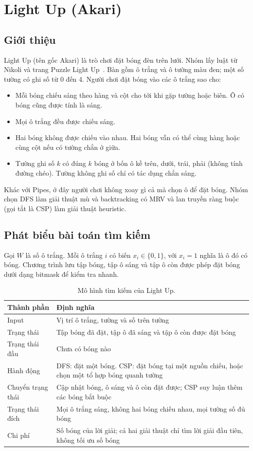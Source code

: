 \clearpage
\section{Light Up (Akari)}
\subsection{Giới thiệu}
Light Up (tên gốc Akari) là trò chơi đặt bóng đèn trên lưới. Nhóm lấy luật từ
Nikoli và trang Puzzle Light Up~\cite{akari-rules,lightup}. Bàn gồm ô trắng và
ô tường màu đen; một số tường có ghi số từ 0 đến 4. Người chơi đặt bóng vào
các ô trắng sao cho:
\begin{itemize}
\item Mỗi bóng chiếu sáng theo hàng và cột cho tới khi gặp tường hoặc biên.
Ô có bóng cũng được tính là sáng.
\item Mọi ô trắng đều được chiếu sáng.
\item Hai bóng không được chiếu vào nhau. Hai bóng vẫn có thể cùng hàng hoặc
cùng cột nếu có tường chắn ở giữa.
\item Tường ghi số $k$ có đúng $k$ bóng ở bốn ô kề trên, dưới, trái, phải
(không tính đường chéo). Tường không ghi số chỉ có tác dụng chắn sáng.
\end{itemize}
Khác với Pipes, ở đây người chơi không xoay gì cả mà chọn ô để đặt bóng. Nhóm
chọn DFS làm giải thuật mù và backtracking có MRV và lan truyền ràng buộc
(gọi tắt là CSP) làm giải thuật heuristic.

\subsection{Phát biểu bài toán tìm kiếm}
Gọi $W$ là số ô trắng. Mỗi ô trắng $i$ có biến $x_i\in\{0,1\}$, với $x_i=1$ nghĩa
là ô đó có bóng. Chương trình lưu tập bóng, tập ô sáng và tập ô còn được phép
đặt bóng dưới dạng bitmask để kiểm tra nhanh.

\begin{table}[H]\centering\small
\begin{tabular}{@{}p{}p{}@{}}\toprule
Thành phần & Định nghĩa\\\midrule
Input & Vị trí ô trắng, tường và số trên tường\\
Trạng thái & Tập bóng đã đặt, tập ô đã sáng và tập ô còn được đặt bóng\\
Trạng thái đầu & Chưa có bóng nào\\
Hành động & DFS: đặt một bóng. CSP: đặt bóng tại một nguồn chiếu, hoặc chọn một tổ hợp bóng quanh tường\\
Chuyển trạng thái & Cập nhật bóng, ô sáng và ô còn đặt được; CSP suy luận thêm các bóng bắt buộc\\
Trạng thái đích & Mọi ô trắng sáng, không hai bóng chiếu nhau, mọi tường số đủ bóng\\
Chi phí & Số bóng của lời giải; cả hai giải thuật chỉ tìm lời giải đầu tiên, không tối ưu số bóng\\\bottomrule
\end{tabular}
\caption{Mô hình tìm kiếm của Light Up.}
\end{table}


